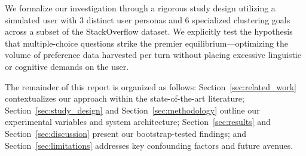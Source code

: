 We formalize our investigation through a rigorous study design utilizing a simulated user with 3 distinct user personas and 6 specialized clustering goals across a subset of the StackOverflow dataset. 
We explicitly test the hypothesis that multiple-choice questions strike the premier equilibrium—optimizing the volume of preference data harvested per turn without placing excessive linguistic or cognitive demands on the user. 

The remainder of this report is organized as follows: 
Section~\ref{sec:related_work} contextualizes our approach within the state-of-the-art literature; 
Section~\ref{sec:study_design} and Section~\ref{sec:methodology} outline our experimental variables and system architecture; 
Section~\ref{sec:results} and Section~\ref{sec:discussion} present our bootstrap-tested findings; 
and Section~\ref{sec:limitations} addresses key confounding factors and future avenues.